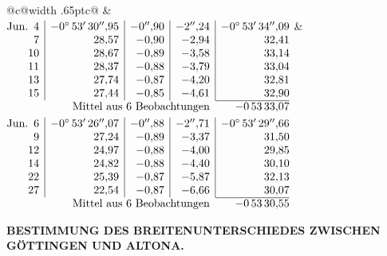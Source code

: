 \noindent\begin{tabular}{@{}c@{\hspace{.4em}\vrule width .65pt\hspace{.4em}}c@{}}
 &
 \\[.18ex]
\(\begin{array}[t]{@{}r|r|r|r|r@{}}
\text{Jun.}\enspace 4 & -0^\circ\,53'\,30''{,}95 & -0''{,}90 & -2''{,}24 & -0^\circ\,53'\,34''{,}09\\
7 & 28{,}57 & -0{,}90 & -2{,}94 & 32{,}41\\
10 & 28{,}67 & -0{,}89 & -3{,}58 & 33{,}14\\
11 & 28{,}37 & -0{,}88 & -3{,}79 & 33{,}04\\
13 & 27{,}74 & -0{,}87 & -4{,}20 & 32{,}81\\
15 & 27{,}44 & -0{,}85 & -4{,}61 & 32{,}90\\
\cline{5-5}
\multicolumn{4}{r}{\text{Mittel aus 6 Beobachtungen}} & -0\,53\,33{,}07
\end{array}\)
&
\(\begin{array}[t]{@{}r|r|r|r|r@{}}
\text{Jun.}\enspace 6 & -0^\circ\,53'\,26''{,}07 & -0''{,}88 & -2''{,}71 & -0^\circ\,53'\,29''{,}66\\
9 & 27{,}24 & -0{,}89 & -3{,}37 & 31{,}50\\
12 & 24{,}97 & -0{,}88 & -4{,}00 & 29{,}85\\
14 & 24{,}82 & -0{,}88 & -4{,}40 & 30{,}10\\
22 & 25{,}39 & -0{,}87 & -5{,}87 & 32{,}13\\
27 & 22{,}54 & -0{,}87 & -6{,}66 & 30{,}07\\
\cline{5-5}
\multicolumn{4}{r}{\text{Mittel aus 6 Beobachtungen}} & -0\,53\,30{,}55
\end{array}\)
\end{tabular}\par\medskip

\par\clearpage
\noindent{}\parbox[t]{\dimexpr\linewidth-24mm\relax}{\centering\scriptsize\bfseries BESTIMMUNG DES BREITENUNTERSCHIEDES ZWISCHEN GÖTTINGEN UND ALTONA.}\makebox[12mm][r]{}\par\medskip

